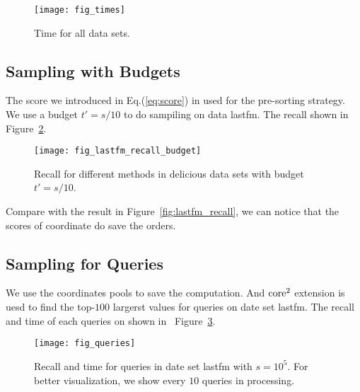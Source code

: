 \documentclass[letterpaper]{article}
\newcommand{\Eqn}[1]   {Eq.(\ref{eq:#1})}
\newcommand{\Fig}[1]   {Figure~\ref{fig:#1}}
\begin{document}
\begin{figure}[H]
  \centering
  \texttt{[image: fig\_times]}\\
  \caption{Time for all data sets.}
  \label{fig:times}
\end{figure}
\subsection{Sampling with Budgets}
The score we introduced in \Eqn{score} in used for the pre-sorting strategy.
We use a budget $t' = s/10$ to do sampiling on data lastfm.
The recall shown in \Fig{budget}.
\begin{figure}[ht]
  \centering
  \texttt{[image: fig\_lastfm\_recall\_budget]}\\
  \caption{Recall for different methods in delicious data sets with budget $t'=s/10$.}
  \label{fig:budget}
\end{figure}
Compare with the result in \Fig{lastfm_recall}, we can notice that the scores of coordinate
do save the orders.
\subsection{Sampling for Queries}
We use the coordinates pools to save the computation.
And ${\rm core}^2$ extension is uesd 
to find the top-$100$ largerst values for queries on date set lastfm.
The recall and time of each queries on shown in ~\Fig{Queries}.
\begin{figure}[ht]
  \centering
  \texttt{[image: fig\_queries]}\\
  \caption{Recall and time for queries in date set lastfm with $s=10^5$.
           For better visualization,
           we show every $10$ queries in processing.}
  \label{fig:Queries}
\end{figure}
\end{document}
